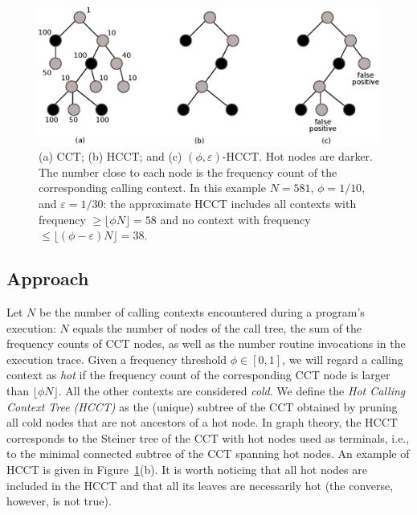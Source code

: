 \documentclass[preprint]{sigplanconf}
\begin{document}
\begin{figure}[t]
\includegraphics[scale=.5]{hctt.eps}
\caption{(a) CCT; (b) HCCT; and (c) $(\phi,\varepsilon)$-HCCT. Hot nodes are darker. The number close to each node is the frequency count of the corresponding calling context. In this example $N=581$, $\phi=1/10$, and $\varepsilon=1/30$: the approximate HCCT includes all contexts with frequency $\ge\lfloor\phi N\rfloor=58$  and no context with frequency $\le\lfloor(\phi-\varepsilon) N\rfloor=38$.}
\label{fig:HCCT}
\end{figure} 


\subsection{Approach}
\label{ss:approach}

Let $N$ be the number of calling contexts encountered during a program's execution: $N$ equals the number of nodes of the call tree, the sum of the frequency counts of CCT nodes, as well as the number routine invocations in the execution trace. Given a frequency threshold $\phi\in[0,1]$, we will regard a calling context as {\em hot} if the frequency count of the corresponding CCT node is larger than $\lfloor\phi N\rfloor$. All the other contexts are considered {\em cold}. We define the {\em Hot Calling Context Tree (HCCT)} as the (unique) subtree of the CCT obtained by pruning all cold nodes that are not ancestors of a hot node. In graph theory, the HCCT corresponds to the Steiner tree of the CCT with hot nodes used as terminals, i.e., to the minimal connected subtree of the CCT spanning hot nodes. An example of HCCT is given in Figure~\ref{fig:HCCT}(b). It is worth noticing that all hot nodes are included in the HCCT and that all its leaves are necessarily hot (the converse, however, is not true).
\end{document}
